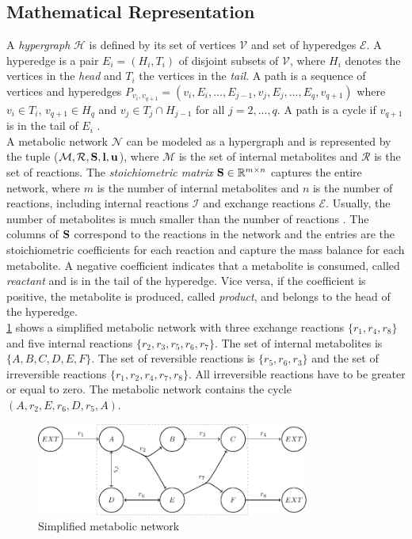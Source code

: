 \subsection{Mathematical Representation} \label{section:mathematical_representation}
A \textit{hypergraph} $\mathscr{H}$ is defined by its set of vertices $\mathscr{V}$ and set of hyperedges $\mathscr{E}$. A hyperedge is a pair $E_i= (H_i,T_i)$ of disjoint subsets of $\mathscr{V}$, where $H_i$ denotes the vertices in the \textit{head} and $T_i$ the vertices in the \textit{tail}. A path is a sequence of vertices and hyperedges $P_{v_i,v_{q+1}} = (v_i, E_i, ..., E_{j-1}, v_j, E_{j}, ..., E_q, v_{q+1})$ where $v_i \in T_i$, $v_{q+1} \in H_q$ and $v_j \in T_j \cap H_{j-1}$ for all $j = 2,...,q$. A path is a cycle if $v_{q+1}$ is in the tail of $E_i$ \cite{gallo_directed_1993}.\\ %
A metabolic network $\mathcal{N}$ can be modeled as a hypergraph and is represented by the tuple ($\mathcal{M}, \mathcal{R}, \bold S, \bold l, \bold u$), where $\mathcal M$ is the set of internal metabolites and $\mathcal{R}$ is the set of reactions. The \textit{stoichiometric matrix} $\bold S \in \mathbb{R}^{m\times n}$ captures the entire network, where $m$ is the number of internal metabolites and $n$ is the number of reactions, including internal reactions $\mathcal{I}$ and exchange reactions $\mathcal{E}$. Usually, the number of metabolites is much smaller than the number of reactions \cite{intro_computational_systems_biology}. 
The columns of $\bold S$ correspond to the reactions in the network and the entries are the stoichiometric coefficients for each reaction and capture the mass balance for each metabolite. A negative coefficient indicates that a metabolite is consumed, called \textit{reactant} and is in the tail of the hyperedge. Vice versa, if the coefficient is positive, the metabolite is produced, called \textit{product}, and belongs to the head of the hyperedge.\\
\cref{fig:simple_model} shows a simplified metabolic network with three exchange reactions $\{r_1, r_4, r_8\}$ and five internal reactions $\{r_2, r_3, r_5, r_6, r_7\}$. The set of internal metabolites is $\{A, B, C, D, E, F\}$. The set of reversible reactions is $\{r_5, r_6, r_3\}$ and the set of irreversible reactions $\{r_1, r_2, r_4, r_7, r_8\}$. All irreversible reactions have to be greater or equal to zero. The metabolic network contains the cycle $(A, r_2, E, r_6, D, r_5, A)$.

\begin{figure}[h!]
    \centering
    \includegraphics[width=0.8\textwidth]{Images/tikz_graphs_model_with_hyperarcs.pdf}
    \caption{Simplified metabolic network}
    \label{fig:simple_model}
\end{figure}

